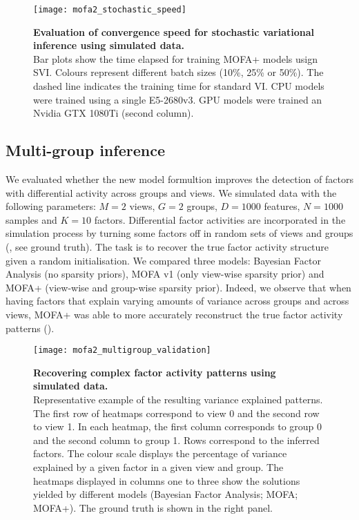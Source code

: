 \begin{figure}[H]
	\centering
	\texttt{[image: mofa2\_stochastic\_speed]}
	\caption[]{
	\textbf{Evaluation of convergence speed for stochastic variational inference using simulated data.} \\
	Bar plots show the time elapsed for training MOFA+ models usign SVI. Colours represent different batch sizes (10\%, 25\% or 50\%). The dashed line indicates the training time for standard VI. CPU models were trained using a single E5-2680v3. GPU models were trained an Nvidia GTX 1080Ti (second column). 
	}
	\label{fig:mofa2_stochastic_speed}
\end{figure}



\subsection{Multi-group inference}

We evaluated whether the new model formultion improves the detection of factors with differential activity across groups and views. We simulated data with the following parameters: $M=2$ views, $G=2$ groups, $D=1000$ features, $N=1000$ samples and $K=10$ factors. Differential factor activities are incorporated in the simulation process by turning some factors off in random sets of views and groups (, see ground truth). The task is to recover the true factor activity structure given a random initialisation. We compared three models: Bayesian Factor Analysis (no sparsity priors), MOFA v1 (only view-wise sparsity prior) and MOFA+ (view-wise and group-wise sparsity prior). Indeed, we observe that when having factors that explain varying amounts of variance across groups and across views, MOFA+ was able to more accurately reconstruct the true factor activity patterns ().

\begin{figure}[H]
	\centering
	\texttt{[image: mofa2\_multigroup\_validation]}
	\caption[]{
	\textbf{Recovering complex factor activity patterns using simulated data.} \\
	Representative example of the resulting variance explained patterns. The first row of heatmaps correspond to view 0 and the second row to view 1. In each heatmap, the first column corresponds to group 0 and the second column to group 1. Rows correspond to the inferred factors. The colour scale displays the percentage of variance explained by a given factor in a given view and group. The heatmaps displayed in columns one to three show the solutions yielded by different models (Bayesian Factor Analysis; MOFA; MOFA+). The ground truth is shown in the right panel. 
	}
	\label{fig:mofa2_multigroup_validation}
\end{figure}




